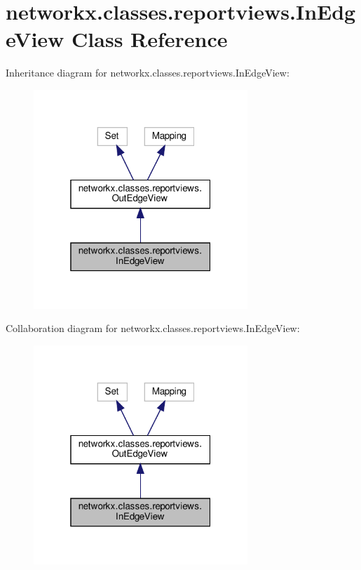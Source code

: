 \hypertarget{classnetworkx_1_1classes_1_1reportviews_1_1InEdgeView}{}\section{networkx.\+classes.\+reportviews.\+In\+Edge\+View Class Reference}
\label{classnetworkx_1_1classes_1_1reportviews_1_1InEdgeView}


Inheritance diagram for networkx.\+classes.\+reportviews.\+In\+Edge\+View\+:
\nopagebreak
\begin{figure}[H]
\begin{center}
\leavevmode
\includegraphics[width=229pt]{classnetworkx_1_1classes_1_1reportviews_1_1InEdgeView__inherit__graph}
\end{center}
\end{figure}


Collaboration diagram for networkx.\+classes.\+reportviews.\+In\+Edge\+View\+:
\nopagebreak
\begin{figure}[H]
\begin{center}
\leavevmode
\includegraphics[width=229pt]{classnetworkx_1_1classes_1_1reportviews_1_1InEdgeView__coll__graph}
\end{center}
\end{figure}
